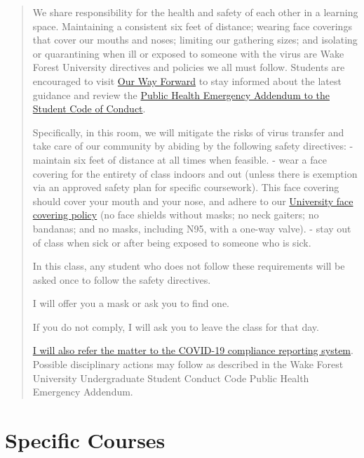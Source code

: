 \begin{quote}
We share responsibility for the health and safety of each other in a learning space. Maintaining a consistent six feet of distance; wearing face coverings that cover our mouths and noses; limiting our gathering sizes; and isolating or quarantining when ill or exposed to someone with the virus are Wake Forest University directives and policies we all must follow. Students are encouraged to visit \href{https://ourwayforward.wfu.edu/}{Our Way Forward} to stay informed about the latest guidance and review the \href{https://studentconduct.wfu.edu/undergraduate-student-handbook/public-health-emergency-addendum/}{Public Health Emergency Addendum to the Student Code of Conduct}.

Specifically, in this room, we will mitigate the risks of virus transfer and take care of our community by abiding by the following safety directives:
- maintain six feet of distance at all times when feasible.
- wear a face covering for the entirety of class indoors and out (unless there is exemption via an approved safety plan for specific coursework). This face covering should cover your mouth and your nose, and adhere to our \href{https://drive.google.com/file/d/1Tqo-by1sjmc-kWUTwAqeNdaHq8OBsU9B/view}{University face covering policy} (no face shields without masks; no neck gaiters; no bandanas; and no masks, including N95, with a one-way valve).
- stay out of class when sick or after being exposed to someone who is sick.

In this class, any student who does not follow these requirements will be asked once to follow the safety directives.

I will offer you a mask or ask you to find one.

If you do not comply, I will ask you to leave the class for that day.

\href{https://cm.maxient.com/reportingform.php?WakeForestUniv\&layout_id=40}{I will also refer the matter to the COVID-19 compliance reporting system}. Possible disciplinary actions may follow as described in the Wake Forest University Undergraduate Student Conduct Code Public Health Emergency Addendum.
\end{quote}

\hypertarget{part-specific-courses}{%
\part*{Specific Courses}\label{part-specific-courses}}


